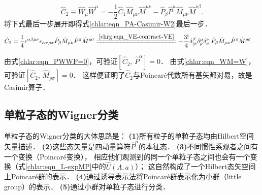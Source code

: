 \begin{equation}\label{chlar:eqn_PA-Casimir-W2}
	\hat{C}_2 \equiv \hat{W}_\mu \hat{W}^\mu 
	= -\frac{1}{2} \hat{C}_1 \hat{M}_{\mu\nu}  \hat{M}^{\mu\nu}
	- \hat{P}_\beta \hat{P}^\mu \hat{M}_{\mu\nu}  \hat{M}^{\nu\beta} .
\end{equation}
将下式最后一步展开即得式\eqref{chlar:eqn_PA-Casimir-W2}最后一步．
\begin{align*}
	\hat{C}_2 &= \frac{1}{4}
	\epsilon^{\alpha\beta\mu\nu} \epsilon_{\alpha\pi\rho\sigma}
	\hat{P}_\beta \hat{M}_{\mu\nu}  \hat{P}^\pi \hat{M}^{\rho\sigma}
	\xlongequal{\ref{chrg:eqn_VE-contract-VE}}
	-\frac{3!}{4}\delta^{\beta} _{[\pi}\delta^{\mu} _{\rho}\delta^{\nu} _{\sigma]}
	\hat{P}_\beta \hat{M}_{\mu\nu}  \hat{P}^\pi \hat{M}^{\rho\sigma}. 
\end{align*}


由式\eqref{chlar:eqn_PWWP=0}，可验证$[\hat{C}_2,\, \hat{P}^\alpha]=0$．
由式\eqref{chlar:eqn_WM=W}，可验证$[\hat{C}_2,\, \hat{M}_{\rho\sigma}]=0$．
这样便证明了$\hat{C}_2$与Poincar\'e代数所有基矢都对易，故是Casimir算子．


\subsection{单粒子态的Wigner分类}\label{chlar:sec_wigner-class}

单粒子态的Wigner分类的大体思路是\cite[\S 2.5]{weinberg_vol1}\cite[\S 10.4]{tung-1985}：
{\bfseries (1)}所有粒子的单粒子态均由Hilbert空间矢量描述．
{\bfseries (2)}这些态矢量是四动量算符$\hat{P}^\mu$的本征态．
{\bfseries (3)}不同惯性系观者之间有一个变换（Poincar\'e变换），
相应他们观测到的同一个单粒子态之间也会有一个变换（式\eqref{chlar:eqn_L-expMP}中的$\hat{U}(\Lambda,a)$）；
这自然构成了一个Hilbert态矢空间上Poincar\'e群的表示．
{\bfseries (4)}通过诱导表示法将Poincar\'e群表示化为{\kaishu 小群}（little group）的表示．
{\bfseries (5)}通过小群对单粒子态进行分类．

